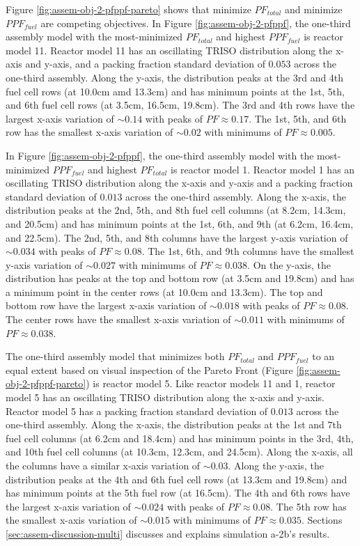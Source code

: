 Figure \ref{fig:assem-obj-2-pfppf-pareto} shows that minimize $PF_{total}$ and 
minimize $PPF_{fuel}$ are competing objectives. 
In Figure \ref{fig:assem-obj-2-pfppf}, the one-third assembly model with 
the most-minimized $PF_{total}$ and highest $PPF_{fuel}$ is reactor model 11. 
Reactor model 11 has an oscillating TRISO distribution along the 
x-axis and y-axis, and a packing fraction standard deviation of $0.053$ across the 
one-third assembly. 
Along the y-axis, the distribution peaks at the 3rd and 4th fuel cell rows (at 
10.0cm amd 13.3cm) and has minimum points at the 1st, 5th, and 6th fuel cell rows 
(at 3.5cm, 16.5cm, 19.8cm). 
The 3rd and 4th rows have the largest x-axis variation of ${\sim}0.14$ with 
peaks of $PF\approx0.17$. 
The 1st, 5th, and 6th row has the smallest x-axis variation of ${\sim}0.02$ with 
minimums of $PF\approx0.005$. 

In Figure \ref{fig:assem-obj-2-pfppf}, the one-third assembly model with 
the most-minimized $PPF_{fuel}$ and highest $PF_{total}$ is reactor model 1.
Reactor model 1 has an oscillating TRISO distribution along the 
x-axis and y-axis and a packing fraction standard deviation of $0.013$ across the 
one-third assembly.
Along the x-axis, the distribution peaks at the 2nd, 5th, and 8th fuel cell columns (at 
8.2cm, 14.3cm, and 20.5cm) and has minimum points at the 1st, 6th, and 9th (at 6.2cm, 
16.4cm, and 22.5cm).
The 2nd, 5th, and 8th columns have the largest y-axis variation of ${\sim}0.034$ with 
peaks of $PF\approx0.08$.
The 1st, 6th, and 9th columns have the smallest y-axis variation of ${\sim}0.027$ with 
minimums of $PF\approx0.038$. 
On the y-axis, the distribution has peaks at the top and bottom row (at 3.5cm and 
19.8cm) and has a minimum point in the center rows (at 10.0cm and 13.3cm).
The top and bottom row have the largest x-axis variation of ${\sim}0.018$ with 
peaks of $PF\approx0.08$.
The center rows have the smallest x-axis variation of ${\sim}0.011$ with minimums 
of $PF\approx0.038$. 

The one-third assembly model that minimizes both $PF_{total}$ and $PPF_{fuel}$ 
to an equal extent based on visual inspection of the Pareto Front (Figure 
\ref{fig:assem-obj-2-pfppf-pareto}) is reactor model 5. 
Like reactor models 11 and 1, reactor model 5 has an oscillating TRISO 
distribution along the x-axis and y-axis. 
Reactor model 5 has a packing fraction standard deviation of $0.013$ across the 
one-third assembly.
Along the x-axis, the distribution peaks at the 1st and 7th fuel cell columns 
(at 6.2cm and 18.4cm) and has minimum points in the 3rd, 4th, and 10th fuel cell 
columns (at 10.3cm, 12.3cm, and 24.5cm).
Along the x-axis, all the columns have a similar x-axis variation of ${\sim}0.03$.
Along the y-axis, the distribution peaks at the 4th and 6th fuel cell rows (at 13.3cm 
and 19.8cm) and has minimum points at the 5th fuel row (at 16.5cm). 
The 4th and 6th rows have the largest x-axis variation of ${\sim}0.024$ with peaks of 
$PF\approx0.08$. 
The 5th row has the smallest x-axis variation of ${\sim}0.015$ with minimums of 
$PF\approx0.035$. 
Sections \ref{sec:assem-discussion-multi} discusses and explains simulation a-2b's 
results.

